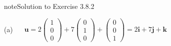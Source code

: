 \documentclass[letterpaper,10pt,english]{jupyterBook}
\begin{document}
\begin{sphinxadmonition}{note}{Solution to Exercise 3.8.2}



\sphinxAtStartPar
(a)   \(\mathbf{u} = 2 \begin{pmatrix} 1 \\ 0 \\ 0 \end{pmatrix} + 7 \begin{pmatrix} 0 \\ 1 \\ 0 \end{pmatrix} + \begin{pmatrix} 0 \\ 0 \\ 1 \end{pmatrix} = 2 \mathbf{i} + 7 \mathbf{j} + \mathbf{k}\)


\end{sphinxadmonition}
\end{document}
